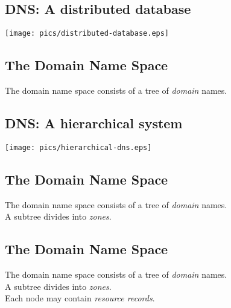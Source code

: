 \documentclass[xga]{xdvislides}
\begin{document}
\subsection{DNS: A distributed database}
\vspace*{\fill}
\begin{center}
	\texttt{[image: pics/distributed-database.eps]}
\end{center}
\vspace*{\fill}

\subsection{The Domain Name Space}
\vspace{.5in}
\begin{center}
	\Huge
	The domain name space consists of a tree of {\em domain} names.
\end{center}
\Normalsize

\subsection{DNS: A hierarchical system}
\vspace*{\fill}
\begin{center}
	\texttt{[image: pics/hierarchical-dns.eps]}
\end{center}
\vspace*{\fill}

\subsection{The Domain Name Space}
\vspace{.5in}
\begin{center}
	\Huge
	The domain name space consists of a tree of {\em domain} names. \\
	\vspace{.5in}
	A subtree divides into {\em zones}.
\end{center}
\Normalsize

\subsection{The Domain Name Space}
\vspace{.5in}
\begin{center}
	\Huge
	The domain name space consists of a tree of {\em domain} names. \\
	\vspace{.5in}
	A subtree divides into {\em zones}. \\
	\vspace{.5in}
	Each node may contain {\em resource records}.
\end{center}
\Normalsize
\end{document}
